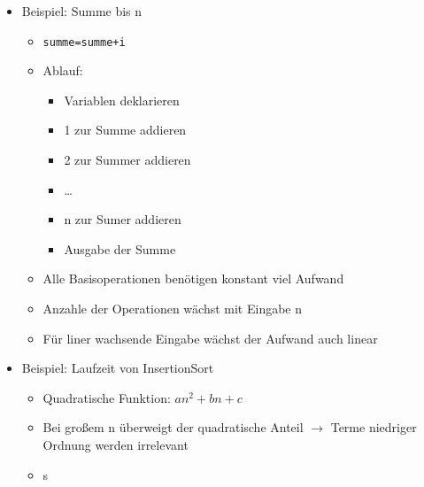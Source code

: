 	\begin{itemize}
		\item Beispiel: Summe bis n
		\begin{itemize}
			\item \texttt{summe=summe+i}
			\item Ablauf:
			\begin{itemize}
				\item Variablen deklarieren
				\item 1 zur Summe addieren
				\item 2 zur Summer addieren
				\item \dots
				\item n zur Sumer addieren
				\item Ausgabe der Summe
			\end{itemize}
			\item Alle Basisoperationen benötigen konstant viel Aufwand 
			\item Anzahle der Operationen wächst mit Eingabe n
			\item Für liner wachsende Eingabe wächst der Aufwand auch linear
		\end{itemize}
		\item Beispiel: Laufzeit von InsertionSort
		\begin{itemize}
			\item Quadratische Funktion: $an^2 + bn + c$
			\item Bei gro\ss em n überweigt der quadratische Anteil $\rightarrow$ Terme niedriger Ordnung werden irrelevant
			\item s
		\end{itemize}
	\end{itemize}


